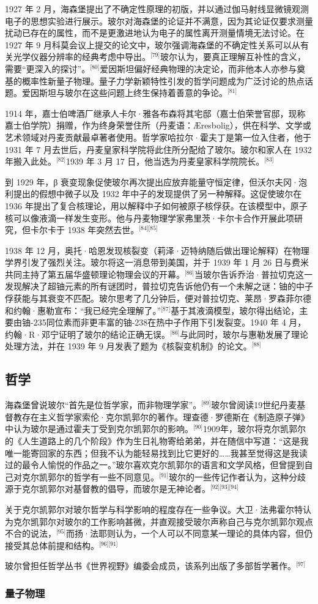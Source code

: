 1927 年 2 月，海森堡提出了不确定性原理的初版，并以通过伽马射线显微镜观测电子的思想实验进行展示。玻尔对海森堡的论证并不满意，因为其论证仅要求测量扰动已存在的属性，而不是更激进地认为电子的属性离开测量情境无法讨论。在 1927 年 9 月科莫会议上提交的论文中，玻尔强调海森堡的不确定性关系可以从有关光学仪器分辨率的经典考虑中导出。\(^\text{[79]}\)玻尔认为，要真正理解互补性的含义，需要“更深入的探讨”。\(^\text{[80]}\)爱因斯坦偏好经典物理的决定论，而非他本人亦参与奠基的概率性新量子物理。量子力学新颖特性引发的哲学问题成为广泛讨论的热点话题。爱因斯坦与玻尔在这些问题上终生保持着善意的争论。\(^\text{[81]}\)

1914 年，嘉士伯啤酒厂继承人卡尔·雅各布森将其宅邸（嘉士伯荣誉官邸，现称嘉士伯学院）捐赠，作为终身荣誉住所（丹麦语：Æresbolig），供在科学、文学或艺术领域对丹麦贡献最卓著者使用。哲学家哈拉尔·霍夫丁是第一位入住者，他于 1931 年 7 月去世后，丹麦皇家科学院将此住所分配给了玻尔。玻尔和家人在 1932 年搬入此处。\(^\text{[82]}\)1939 年 3 月 17 日，他当选为丹麦皇家科学院院长。\(^\text{[83]}\)

到 1929 年，β 衰变现象促使玻尔再次提出应放弃能量守恒定律，但沃尔夫冈·泡利提出的假想中微子以及 1932 年中子的发现提供了另一种解释。这促使玻尔在 1936 年提出了复合核理论，用以解释中子如何被原子核俘获。在该模型中，原子核可以像液滴一样发生变形。他与丹麦物理学家弗里茨·卡尔卡合作开展此项研究，但卡尔卡于 1938 年突然去世。\(^\text{[84][85]}\)

1938 年 12 月，奥托·哈恩发现核裂变（莉泽·迈特纳随后做出理论解释）在物理学界引发了强烈关注。玻尔将这一消息带到美国，并于 1939 年 1 月 26 日与费米共同主持了第五届华盛顿理论物理会议的开幕。\(^\text{[86]}\)当玻尔告诉乔治·普拉切克这一发现解决了超铀元素的所有谜团时，普拉切克告诉他仍有一个未解之谜：铀的中子俘获能与其衰变不匹配。玻尔思考了几分钟后，便对普拉切克、莱昂·罗森菲尔德和约翰·惠勒宣布：“我已经完全理解了。”\(^\text{[87]}\)基于其液滴模型，玻尔得出结论，主要由铀-235同位素而非更丰富的铀-238在热中子作用下引发裂变。1940 年 4 月，约翰·R·邓宁证明了玻尔的结论正确无误。\(^\text{[86]}\)与此同时，玻尔与惠勒发展了理论处理方法，并在 1939 年 9 月发表了题为《核裂变机制》的论文。\(^\text{[88]}\)
\subsection{哲学}
海森堡曾说玻尔“首先是位哲学家，而非物理学家”。\(^\text{[89]}\)玻尔曾阅读19世纪丹麦基督教存在主义哲学家索伦·克尔凯郭尔的著作。理查德·罗德斯在《制造原子弹》中认为玻尔是通过霍夫丁受到克尔凯郭尔的影响。\(^\text{[90]}\)1909年，玻尔将克尔凯郭尔的《人生道路上的几个阶段》作为生日礼物寄给弟弟，并在随信中写道：“这是我唯一能寄回家的东西；但我不认为能轻易找到比它更好的……我甚至觉得这是我读过的最令人愉悦的作品之一。”玻尔喜欢克尔凯郭尔的语言和文学风格，但曾提到自己对克尔凯郭尔的哲学有一些不同意见。\(^\text{[91]}\)玻尔的一些传记作者认为，这种分歧源于克尔凯郭尔对基督教的倡导，而玻尔是无神论者。\(^\text{[92][93][94]}\)

关于克尔凯郭尔对玻尔哲学与科学影响的程度存在一些争议。大卫·法弗霍尔特认为克尔凯郭尔对玻尔的工作影响甚微，并直观接受玻尔声称自己与克尔凯郭尔观点不合的说法，\(^\text{[95]}\)而扬·法耶则认为，一个人可以不同意某一理论的具体内容，但仍接受其总体前提和结构。\(^\text{[96][91]}\)

玻尔曾担任哲学丛书《世界视野》编委会成员，该系列出版了多部哲学著作。\(^\text{[97]}\)
\subsubsection{量子物理}